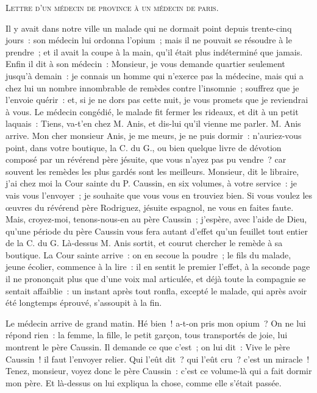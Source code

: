 \documentclass[french,twoside]{book} %
\begin{document}
\begin{center}
\noindent \centerline{{\scshape Lettre d’un médecin de province à un médecin de paris}.}\par
\end{center}

\noindent Il y avait dans notre ville un malade qui ne dormait point depuis trente-cinq jours : son médecin lui ordonna l’opium ; mais il ne pouvait se résoudre à le prendre ; et il avait la coupe à la main, qu’il était plus indéterminé que jamais. Enfin il dit à son médecin : Monsieur, je vous demande quartier seulement jusqu’à demain : je connais un homme qui n’exerce pas la médecine, mais qui a chez lui un nombre innombrable de remèdes contre l’insomnie ; souffrez que je l’envoie quérir : et, si je ne dors pas cette nuit, je vous promets que je reviendrai à vous. Le médecin congédié, le malade fit fermer les rideaux, et dit à un petit laquais : Tiens, va-t’en chez M. Anis, et dis-lui qu’il vienne me parler. M. Anis arrive. Mon cher monsieur Anis, je me meurs, je ne puis dormir : n’auriez-vous point, dans votre boutique, la C. du G., ou bien quelque livre de dévotion composé par un révérend père jésuite, que vous n’ayez pas pu vendre ? car souvent les remèdes les plus gardés sont les meilleurs. Monsieur, dit le libraire, j’ai chez moi la Cour sainte du P. Caussin, en six volumes, à votre service : je vais vous l’envoyer ; je souhaite que vous vous en trouviez bien. Si vous voulez les œuvres du révérend père Rodriguez, jésuite espagnol, ne vous en faites faute. Mais, croyez-moi, tenons-nous-en au père Caussin ; j’espère, avec l’aide de Dieu, qu’une période du père Caussin vous fera autant d’effet qu’un feuillet tout entier de la C. du G. Là-dessus M. Anis sortit, et courut chercher le remède à sa boutique. La Cour sainte arrive : on en secoue la poudre ; le fils du malade, jeune écolier, commence à la lire : il en sentit le premier l’effet, à la seconde page il ne prononçait plus que d’une voix mal articulée, et déjà toute la compagnie se sentait affaiblie : un instant après tout ronfla, excepté le malade, qui après avoir été longtemps éprouvé, s’assoupit à la fin.\par
Le médecin arrive de grand matin. Hé bien ! a-t-on pris mon opium ? On ne lui répond rien : la femme, la fille, le petit garçon, tous transportés de joie, lui montrent le père Caussin. Il demande ce que c’est ; on lui dit : Vive le père Caussin ! il faut l’envoyer relier. Qui l’eût dit ? qui l’eût cru ? c’est un miracle ! Tenez, monsieur, voyez donc le père Caussin : c’est ce volume-là qui a fait dormir mon père. Et là-dessus on lui expliqua la chose, comme elle s’était passée.\par
\end{document}
